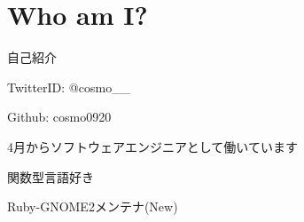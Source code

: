 \section{Who am I?}

\begin{frame}
\begin{block}{自己紹介}
\begin{itemize}
{\Large
\item TwitterID: @cosmo\_\_
\item Github: cosmo0920
\item 4月からソフトウェアエンジニアとして働いています
\item 関数型言語好き
\item Ruby-GNOME2メンテナ(New)
}
\end{itemize}
\end{block}
\end{frame}
